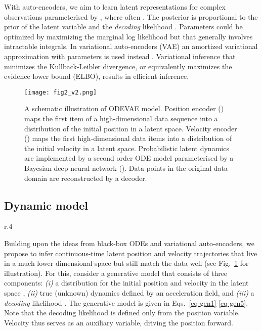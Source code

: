 \documentclass{article}
\newcommand{\0}{\mathbf{0}}
\begin{document}
With auto-encoders, we aim to learn latent representations  for complex observations  parameterised by , where often . The posterior  is proportional to the prior  of the latent variable and the \emph{decoding} likelihood . Parameters  could be optimized by maximizing the marginal log likelihood but that generally involves intractable integrals. In variational auto-encoders (VAE) an amortized variational approximation  with parameters  is used instead 
\citep{jordan1999,kingma2013auto,rezende2014}. Variational inference that minimizes the Kullback-Leibler divergence, or equivalently maximizes the evidence lower bound (ELBO), results in efficient inference.




























\begin{figure}
    \centering
    \texttt{[image: fig2\_v2.png]}
    \caption{A schematic illustration of ODEVAE model. Position encoder () maps the first item  of a high-dimensional data sequence into a distribution of the initial position  in a latent space. Velocity encoder () maps the first  high-dimensional data items  into a distribution of the initial velocity  in a latent space. Probabilistic latent dynamics are implemented by a second order ODE model  parameterised by a Bayesian deep neural network (). Data points in the original data domain are reconstructed by a decoder.}
    \label{fig:fig2}  
\end{figure}

\subsection{Dynamic model}
\begin{wrapfigure}[9]{r}{.4\textwidth}
    \vspace*{-0.9cm}

\end{wrapfigure}
Building upon the ideas from black-box ODEs and variational auto-encoders, we propose to infer continuous-time latent position and velocity trajectories that live in a much lower dimensional space but still match the data well (see Fig.~\ref{fig:fig2} for illustration). 
For this, consider a generative model that consists of three components: {\em (i)} a distribution for the initial position  and velocity  in the latent space , {\em (ii)} true (unknown) dynamics defined by an acceleration field, and {\em (iii)} a {\em decoding} likelihood .
The generative model is given in Eqs.~\ref{eq-gen1}-\ref{eq-gen5}. Note that the decoding likelihood is defined only from the position variable. Velocity thus serves as an auxiliary variable, driving the position forward. 
\end{document}
